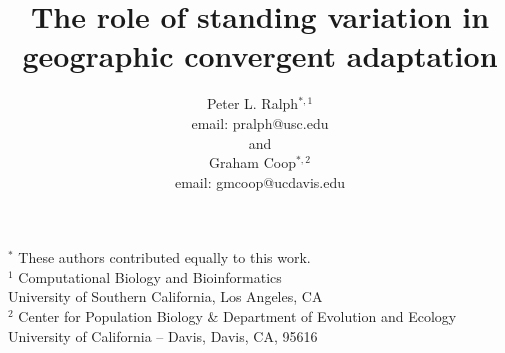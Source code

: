 \documentclass{article}
\title{The role of standing variation in geographic convergent adaptation}
\author{
Peter L. Ralph$^{*,1}$ \\ email: pralph@usc.edu  
\\and\\
Graham Coop$^{*,2}$ \\ email: gmcoop@ucdavis.edu 
}
\begin{document}
\maketitle
\date{}

\begin{center}

    $^*$ These authors contributed equally to this work. \\
$^1$ Computational Biology and Bioinformatics \\ 
University of Southern California, Los Angeles, CA \\
$^2$ Center for Population Biology \& Department of Evolution and Ecology \\ 
University of California -- Davis, Davis, CA, 95616\\
\end{center}


\linenumbers
\modulolinenumbers[2]
\end{document}
